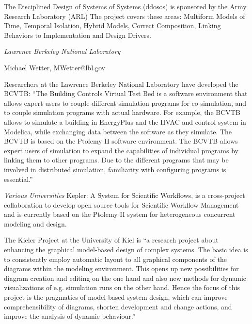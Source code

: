                  The Disciplined Design of Systems of Systems (ddosos) is sponsored by
                 the Army Research Laboratory (ARL) The project covers these areas:
                 Multiform Models of Time, Temporal Isolation, Hybrid Models, Correct
                 Composition, Linking Behaviors to Implementation and Design Drivers.

                 \emph{Lawrence Berkeley National Laboratory}

                 Michael Wetter, MWetter@lbl.gov

                 Researchers at the Lawrence Berkeley National Laboratory have developed the BCVTB:
                 ``The Building Controls Virtual Test Bed is a software
                 environment that allows expert users to couple
                 different simulation programs for co-simulation, and to
                 couple simulation programs with actual hardware. For
                 example, the BCVTB allows to simulate a building in
                 EnergyPlus and the HVAC and control system in Modelica,
                 while exchanging data between the software as they
                 simulate. The BCVTB is based on the Ptolemy II software
                 environment. The BCVTB allows expert users of
                 simulation to expand the capabilities of individual
                 programs by linking them to other programs. Due to the
                 different programs that may be involved in distributed
                 simulation, familiarity with configuring programs is
                 essential.''

                 \emph{Various Universities}
                 Kepler: A System for Scientific Workflows, is a cross-project collaboration to develop open source tools for Scientific Workflow Management and is currently based on the Ptolemy II system for heterogeneous concurrent modeling and design. 

                 The Kieler Project at the University of Kiel is ``a research project about enhancing the graphical model-based design of complex systems. The basic idea is to consistently employ automatic layout to all graphical components of the diagrams within the modeling environment. This opens up new possibilities for diagram creation and editing on the one hand and also new methods for dynamic visualizations of e.g. simulation runs on the other hand. Hence the focus of this project is the pragmatics of model-based system design, which can improve comprehensibility of diagrams, shorten development and change actions, and improve the analysis of dynamic behaviour.'' 

